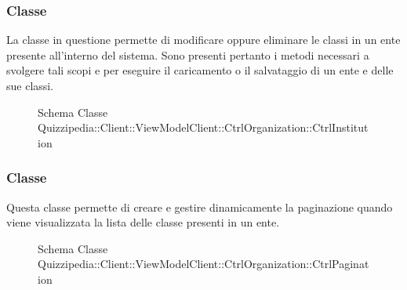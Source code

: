 \subsubsection{Classe }
La classe in questione permette di modificare oppure eliminare le classi in un ente presente all'interno del sistema.
Sono presenti pertanto i metodi necessari a svolgere tali scopi e per eseguire il caricamento o il salvataggio di un ente e delle sue classi.
\begin{figure}[H]
\centering
\noindent{}
\caption[Schema Classe CtrlInstitution]{Schema Classe Quizzipedia::Client::ViewModelClient::CtrlOrganization::CtrlInstitution}
\end{figure}
\subsubsection{Classe }
Questa classe permette di creare e gestire dinamicamente la paginazione quando viene visualizzata la lista delle classe presenti in un ente.
\begin{figure}[H]
\centering
\noindent{}
\caption[Schema Classe CtrlPagination]{Schema Classe Quizzipedia::Client::ViewModelClient::CtrlOrganization::CtrlPagination}
\end{figure}

